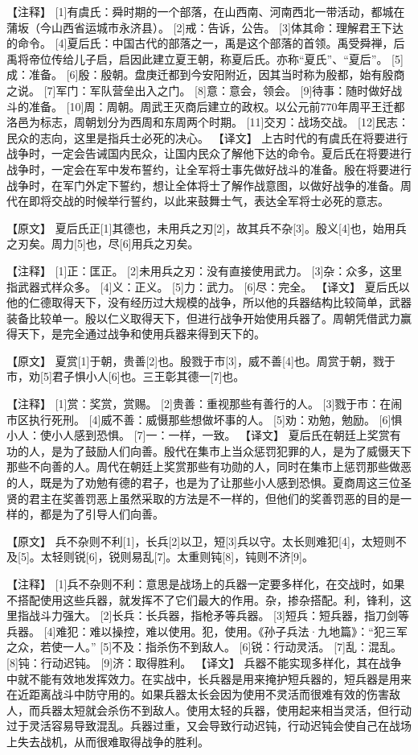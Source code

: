 \documentclass[a4paper,12pt,UTF8,twoside]{ctexbook}
\begin{document}
【注释】
[1]有虞氏：舜时期的一个部落，在山西南、河南西北一带活动，都城在蒲坂（今山西省运城市永济县）。
[2]戒：告诉，公告。
[3]体其命：理解君王下达的命令。
[4]夏后氏：中国古代的部落之一，禹是这个部落的首领。禹受舜禅，后禹将帝位传给儿子启，启因此建立夏王朝，称夏后氏。亦称“夏氏”、“夏后”。
[5]成：准备。
[6]殷：殷朝。盘庚迁都到今安阳附近，因其当时称为殷都，始有殷商之说。
[7]军门：军队营垒出入之门。
[8]意：意会，领会。
[9]待事：随时做好战斗的准备。
[10]周：周朝。周武王灭商后建立的政权。以公元前770年周平王迁都洛邑为标志，周朝划分为西周和东周两个时期。
[11]交刃：战场交战。
[12]民志：民众的志向，这里是指兵士必死的决心。
【译文】
上古时代的有虞氏在将要进行战争时，一定会告诫国内民众，让国内民众了解他下达的命令。夏后氏在将要进行战争时，一定会在军中发布誓约，让全军将士事先做好战斗的准备。殷在将要进行战争时，在军门外定下誓约，想让全体将士了解作战意图，以做好战争的准备。周代在即将交战的时候举行誓约，以此来鼓舞士气，表达全军将士必死的意志。


【原文】
夏后氏正[1]其德也，未用兵之刃[2]，故其兵不杂[3]。殷义[4]也，始用兵之刃矣。周力[5]也，尽[6]用兵之刃矣。



【注释】
[1]正：匡正。
[2]未用兵之刃：没有直接使用武力。
[3]杂：众多，这里指武器式样众多。
[4]义：正义。
[5]力：武力。
[6]尽：完全。
【译文】
夏后氏以他的仁德取得天下，没有经历过大规模的战争，所以他的兵器结构比较简单，武器装备比较单一。殷以仁义取得天下，但进行战争开始使用兵器了。周朝凭借武力赢得天下，是完全通过战争和使用兵器来得到天下的。


【原文】
夏赏[1]于朝，贵善[2]也。殷戮于市[3]，威不善[4]也。周赏于朝，戮于市，劝[5]君子惧小人[6]也。三王彰其德一[7]也。



【注释】
[1]赏：奖赏，赏赐。
[2]贵善：重视那些有善行的人。
[3]戮于市：在闹市区执行死刑。
[4]威不善：威慑那些想做坏事的人。
[5]劝：劝勉，勉励。
[6]惧小人：使小人感到恐惧。
[7]一：一样，一致。
【译文】
夏后氏在朝廷上奖赏有功的人，是为了鼓励人们向善。殷代在集市上当众惩罚犯罪的人，是为了威慑天下那些不向善的人。周代在朝廷上奖赏那些有功勋的人，同时在集市上惩罚那些做恶的人，既是为了劝勉有德的君子，也是为了让那些小人感到恐惧。夏商周这三位圣贤的君主在奖善罚恶上虽然采取的方法是不一样的，但他们的奖善罚恶的目的是一样的，都是为了引导人们向善。


【原文】
兵不杂则不利[1]，长兵[2]以卫，短[3]兵以守。太长则难犯[4]，太短则不及[5]。太轻则锐[6]，锐则易乱[7]。太重则钝[8]，钝则不济[9]。



【注释】
[1]兵不杂则不利：意思是战场上的兵器一定要多样化，在交战时，如果不搭配使用这些兵器，就发挥不了它们最大的作用。杂，掺杂搭配。利，锋利，这里指战斗力强大。
[2]长兵：长兵器，指枪矛等兵器。
[3]短兵：短兵器，指刀剑等兵器。
[4]难犯：难以操控，难以使用。犯，使用。《孙子兵法·九地篇》：“犯三军之众，若使一人。”
[5]不及：指杀伤不到敌人。
[6]锐：行动灵活。
[7]乱：混乱。
[8]钝：行动迟钝。
[9]济：取得胜利。
【译文】
兵器不能实现多样化，其在战争中就不能有效地发挥效力。在实战中，长兵器是用来掩护短兵器的，短兵器是用来在近距离战斗中防守用的。如果兵器太长会因为使用不灵活而很难有效的伤害敌人，而兵器太短就会杀伤不到敌人。使用太轻的兵器，使用起来相当灵活，但行动过于灵活容易导致混乱。兵器过重，又会导致行动迟钝，行动迟钝会使自己在战场上失去战机，从而很难取得战争的胜利。
\end{document}
